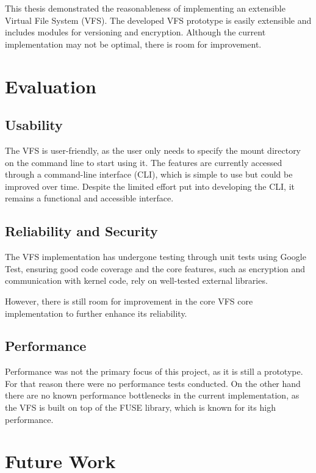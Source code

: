 
This thesis demonstrated the reasonableness of implementing an extensible Virtual File System (VFS).
The developed VFS prototype is easily extensible and includes modules for versioning and encryption.
Although the current implementation may not be optimal, there is room for improvement.

\section{Evaluation}

\subsection{Usability}

The VFS is user-friendly, as the user only needs to specify the mount directory on the command line to start using it.
The features are currently accessed through a command-line interface (CLI), which is simple to use but could be improved over time.
Despite the limited effort put into developing the CLI, it remains a functional and accessible interface.

\subsection{Reliability and Security}

The VFS implementation has undergone testing through unit tests using Google Test, ensuring good code coverage and the core features, such as encryption and communication with kernel code, rely on well-tested external libraries.

However, there is still room for improvement in the core VFS core implementation to further enhance its reliability.

\subsection{Performance}

Performance was not the primary focus of this project, as it is still a prototype.
For that reason there were no performance tests conducted.
On the other hand there are no known performance bottlenecks in the current implementation, as the VFS is built on top of the FUSE library, which is known for its high performance.

\section{Future Work}

